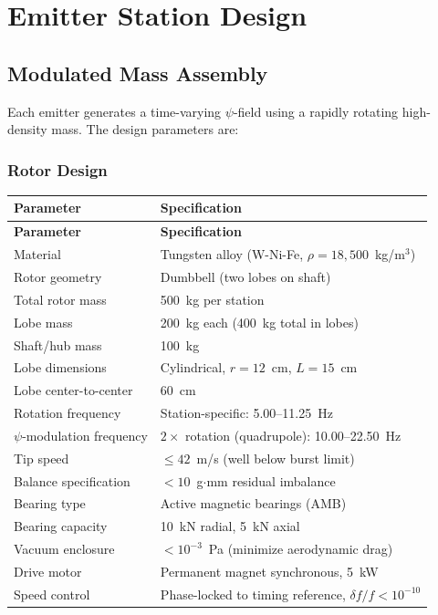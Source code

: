\documentclass[11pt,a4paper]{article}
\begin{document}
\section{Emitter Station Design}

\subsection{Modulated Mass Assembly}

Each emitter generates a time-varying $\psi$-field using a rapidly
rotating high-density mass. The design parameters are:

\subsubsection{Rotor Design}

\begin{longtable}{p{5cm}p{8cm}}
\toprule
\textbf{Parameter} & \textbf{Specification} \\
\midrule
\endfirsthead
\midrule
\textbf{Parameter} & \textbf{Specification} \\
\midrule
\endhead
Material & Tungsten alloy (W-Ni-Fe, $\rho = 18{,}500$~kg/m$^3$) \\
Rotor geometry & Dumbbell (two lobes on shaft) \\
Total rotor mass & 500~kg per station \\
Lobe mass & 200~kg each (400~kg total in lobes) \\
Shaft/hub mass & 100~kg \\
Lobe dimensions & Cylindrical, $r = 12$~cm, $L = 15$~cm \\
Lobe center-to-center & 60~cm \\
Rotation frequency & Station-specific: 5.00--11.25~Hz \\
$\psi$-modulation frequency & $2\times$ rotation (quadrupole): 10.00--22.50~Hz \\
Tip speed & $\leq 42$~m/s (well below burst limit) \\
Balance specification & $< 10$~g$\cdot$mm residual imbalance \\
Bearing type & Active magnetic bearings (AMB) \\
Bearing capacity & 10~kN radial, 5~kN axial \\
Vacuum enclosure & $< 10^{-3}$~Pa (minimize aerodynamic drag) \\
Drive motor & Permanent magnet synchronous, 5~kW \\
Speed control & Phase-locked to timing reference, $\delta f/f < 10^{-10}$ \\
\bottomrule
\end{longtable}
\end{document}
